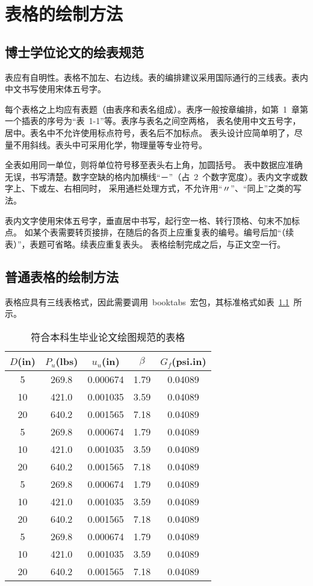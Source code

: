 
\chapter{表格的绘制方法}
\section{博士学位论文的绘表规范}

表应有自明性。表格不加左、右边线。表的编排建议采用国际通行的三线表。表内中文书写使用宋体五号字。

每个表格之上均应有表题（由表序和表名组成）。表序一般按章编排，如第~1~章第一个插表的序号为“表~1-1”等。表序与表名之间空两格，
表名使用中文五号字，居中。表名中不允许使用标点符号，表名后不加标点。
表头设计应简单明了，尽量不用斜线。表头中可采用化学，物理量等专业符号。

全表如用同一单位，则将单位符号移至表头右上角，加圆括号。
表中数据应准确无误，书写清楚。数字空缺的格内加横线“－”（占~2~个数字宽度）。表内文字或数字上、下或左、右相同时，
采用通栏处理方式，不允许用“〃”、“同上”之类的写法。

表内文字使用宋体五号字，垂直居中书写，起行空一格、转行顶格、句末不加标点。
如某个表需要转页接排，在随后的各页上应重复表的编号。编号后加“（续表）”，表题可省略。续表应重复表头。
表格绘制完成之后，与正文空一行。

\section{普通表格的绘制方法}

表格应具有三线表格式，因此需要调用~booktabs~宏包，其标准格式如表~\ref{tab:table1}~所示。
\begin{table}[htbp]
\caption{符合本科生毕业论文绘图规范的表格}\label{tab:table1}
\vspace{0.5em}\centering\wuhao
\begin{tabular}{ccccc}
\toprule[1.5pt]
$D$(in) & $P_u$(lbs) & $u_u$(in) & $\beta$ & $G_f$(psi.in)\\
\midrule[1pt]
 5 & 269.8 & 0.000674 & 1.79 & 0.04089\\
10 & 421.0 & 0.001035 & 3.59 & 0.04089\\
20 & 640.2 & 0.001565 & 7.18 & 0.04089\\
 5 & 269.8 & 0.000674 & 1.79 & 0.04089\\
10 & 421.0 & 0.001035 & 3.59 & 0.04089\\
20 & 640.2 & 0.001565 & 7.18 & 0.04089\\
 5 & 269.8 & 0.000674 & 1.79 & 0.04089\\
10 & 421.0 & 0.001035 & 3.59 & 0.04089\\
20 & 640.2 & 0.001565 & 7.18 & 0.04089\\
 5 & 269.8 & 0.000674 & 1.79 & 0.04089\\
10 & 421.0 & 0.001035 & 3.59 & 0.04089\\
20 & 640.2 & 0.001565 & 7.18 & 0.04089\\
\bottomrule[1.5pt]
\end{tabular}
\vspace{\baselineskip}
\end{table}

